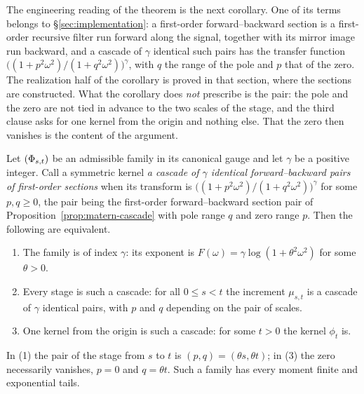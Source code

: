 The engineering reading of the theorem is the next corollary. One of its terms belongs to
\S\ref{sec:implementation}: a first-order forward--backward section is a first-order recursive
filter run forward along the signal, together with its mirror image run backward, and a cascade
of $\gamma$ identical such pairs has the transfer function
$\bigl((1+p^2\omega^2)/(1+q^2\omega^2)\bigr)^\gamma$, with $q$ the range of the pole and $p$ that
of the zero. The realization half of the corollary is proved in that section, where the sections
are constructed. What the corollary does \emph{not} prescribe is the pair: the pole and the zero
are not tied in advance to the two scales of the stage, and the third clause asks for one kernel
from the origin and nothing else. That the zero then vanishes is the content of the argument.

\begin{corollary}
\label{cor:matern-realization}
Let $(\Phi_{s,t})$ be an admissible family in its canonical gauge and let $\gamma$ be a positive
integer. Call a symmetric kernel \emph{a cascade of $\gamma$ identical forward--backward pairs of
first-order sections} when its transform is
$\bigl((1+p^2\omega^2)/(1+q^2\omega^2)\bigr)^{\gamma}$ for some $p, q \ge 0$, the pair being the
first-order forward--backward section pair of Proposition~\ref{prop:matern-cascade} with pole
range $q$ and zero range $p$. Then the following are equivalent.
\begin{enumerate}
\item The family is \Matern{} of index $\gamma$: its exponent is
$F(\omega) = \gamma\log(1+\theta^2\omega^2)$ for some $\theta > 0$.
\item Every stage is such a cascade: for all $0 \le s < t$ the increment $\mu_{s,t}$ is a cascade
of $\gamma$ identical pairs, with $p$ and $q$ depending on the pair of scales.
\item One kernel from the origin is such a cascade: for some $t > 0$ the kernel $\phi_t$ is.
\end{enumerate}
In (1) the pair of the stage from $s$ to $t$ is $(p,q) = (\theta s, \theta t)$; in (3) the zero
necessarily vanishes, $p = 0$ and $q = \theta t$. Such a family has every moment finite and
exponential tails.
\end{corollary}

